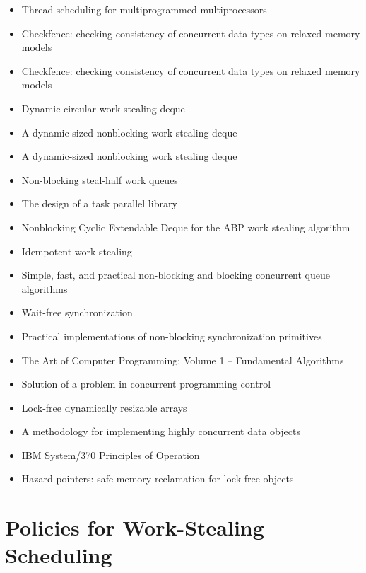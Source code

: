 \begin{itemize}
\item[\checkmark] Thread scheduling for multiprogrammed
  multiprocessors \cite{Arora2001}
\item Checkfence: checking consistency of concurrent data types on
  relaxed memory models \cite{Burckhardt2007}
\item Checkfence: checking consistency of concurrent data types on
  relaxed memory models \cite{Burckhardt2007a}
\item Dynamic circular work-stealing deque \cite{Chase2005}
\item A dynamic-sized nonblocking work stealing deque
  \cite{Hendler2006}
\item A dynamic-sized nonblocking work stealing deque
  \cite{Hendler2006a}
\item Non-blocking steal-half work queues \cite{Hendler2002}
\item The design of a task parallel library \cite{Leijen2009}
\item Nonblocking Cyclic Extendable Deque for the ABP work stealing
  algorithm \cite{Lev2005}
\item[\checkmark] Idempotent work stealing \cite{Michael2009}
\item Simple, fast, and practical non-blocking and blocking concurrent
  queue algorithms \cite{Michael1996}
\item[\checkmark] Wait-free synchronization \cite{Herlihy1991}
\item[\checkmark] Practical implementations of non-blocking
  synchronization primitives \cite{Moir1997}
\item[\checkmark] The Art of Computer Programming: Volume 1 --
  Fundamental Algorithms \cite{Knuth1997}
\item Solution of a problem in concurrent programming control
  \cite{Dijkstra1965} 
\item Lock-free dynamically resizable arrays \cite{Dechev2006}
\item A methodology for implementing highly concurrent data objects
  \cite{Herlihy1993}
\item IBM System/370 Principles of Operation \cite{IBM1974}
\item Hazard pointers: safe memory reclamation for lock-free objects
  \cite{Michael2004}
\end{itemize}


\section*{Policies for Work-Stealing Scheduling}
\label{sec:lr-policies-for-work-stealing-scheduling}

